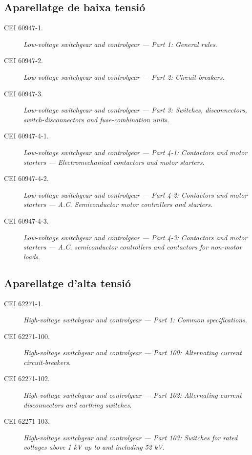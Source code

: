 \subsection*{Aparellatge de baixa tensió}
\begin{description}
	
	\item [\hspace{5mm}CEI 60947-1.] \textit{Low-voltage switchgear and controlgear --- Part 1: General rules}.
	\item [\hspace{5mm}CEI 60947-2.] \textit{Low-voltage switchgear and controlgear --- Part 2: Circuit-breakers}.
	\item [\hspace{5mm}CEI 60947-3.] \textit{Low-voltage switchgear and controlgear --- Part 3: Switches, disconnectors, switch-dis\-con\-nec\-tors and fuse-combination units}.
	\item [\hspace{5mm}CEI 60947-4-1.] \textit{Low-voltage switchgear and controlgear --- Part 4-1: Contactors and motor starters ---  Electromechanical contactors and motor starters}.
	\item [\hspace{5mm}CEI 60947-4-2.] \textit{Low-voltage switchgear and controlgear --- Part 4-2: Contactors and motor starters ---  A.C. Semiconductor motor controllers and starters}.
	\item [\hspace{5mm}CEI 60947-4-3.] \textit{Low-voltage switchgear and controlgear --- Part 4-3: Contactors and motor starters ---  A.C. semiconductor controllers and contactors for non-motor loads}.
\end{description}


\subsection*{Aparellatge d'alta tensió}
\begin{description}
	\item [\hspace{5mm}CEI 62271-1.] \textit{High-voltage switchgear and controlgear --- Part 1: Common specifications}.
	\item [\hspace{5mm}CEI 62271-100.] \textit{High-voltage switchgear and controlgear --- Part 100: Alternating current circuit-breakers}.
	\item [\hspace{5mm}CEI 62271-102.] \textit{High-voltage switchgear and controlgear --- Part 102: Alternating current disconnectors and earthing switches}.
	\item [\hspace{5mm}CEI 62271-103.] \textit{High-voltage switchgear and controlgear --- Part 103: Switches for rated voltages above 1 kV up to and including 52 kV}.
\end{description}


